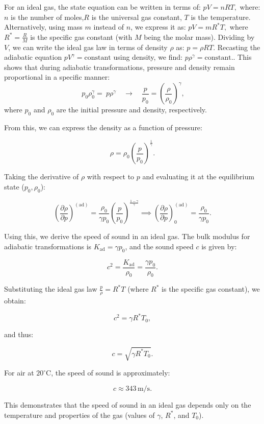 \documentclass[a4paper]{article}
\begin{document}
For an ideal gas, the state equation can be written in terms of:
   \(
   p V = n R T,
   \)
   where:\(n\) is the number of moles,\(R\) is the universal gas constant, \(T\) is the temperature.  Alternatively, using mass \(m\) instead of \(n\), we express it as:
   \(
   p V = m R^* T,
   \)
   where \(R^* = \frac{R}{M}\) is the specific gas constant (with \(M\) being the molar mass).  
Dividing by \(V\), we can write the ideal gas law in terms of density \(\rho\) as:
   \(
   p = \rho R T.
   \)
Recasting the adiabatic equation \(p V^\gamma = \text{constant}\) using density, we find:
   \(
   p \rho^{\gamma} = \text{constant}.
   \). This shows that during adiabatic transformations, pressure and density remain proportional in a specific manner:
   \[
   \ p_0 \rho_0^\gamma = \ p \rho^\gamma 
   \quad \to \quad
   \frac{p}{p_0} = \left(\frac{\rho}{\rho_0}\right)^\gamma,
   \]
   where \(p_0\) and \(\rho_0\) are the initial pressure and density, respectively.


From this, we can express the density as a function of pressure:

\[
\rho = \rho_0 \left(\frac{p}{p_0}\right)^{\frac{1}{\gamma}}.
\]

Taking the derivative of \(\rho\) with respect to \(p\) and evaluating it at the equilibrium state (\(p_0, \rho_0\)):

\[
\left( \frac{\partial \rho}{\partial p} \right)^{(\text{ad})} 
= \frac{\rho_0}{\gamma p_0} \left( \frac{p}{p_0} \right)^{\frac{1-\gamma}{\gamma}} 
\implies 
\left( \frac{\partial \rho}{\partial p} \right)_0^{(\text{ad})} 
= \frac{\rho_0}{\gamma p_0}.
\]


Using this, we derive the speed of sound in an ideal gas. The bulk modulus for adiabatic transformations is \(K_\text{ad} = \gamma p_0\), and the sound speed \(c\) is given by:

\[
c^2 = \frac{K_\text{ad}}{\rho_0} = \frac{\gamma p_0}{\rho_0}.
\]

Substituting the ideal gas law \( \frac{p}{\rho} = R^* T\) (where \(R^*\) is the specific gas constant), we obtain:

\[
c^2 = \gamma R^* T_0,
\]

and thus:

\[
c = \sqrt{\gamma R^* T_0}.
\]

For air at \(20^\circ \text{C}\), the speed of sound is approximately:

\[
c \approx 343 \, \text{m/s}.
\]

This demonstrates that the speed of sound in an ideal gas depends only on the temperature and properties of the gas (values of \(\gamma\), \(R^*\), and \(T_0\)).\\
\end{document}
